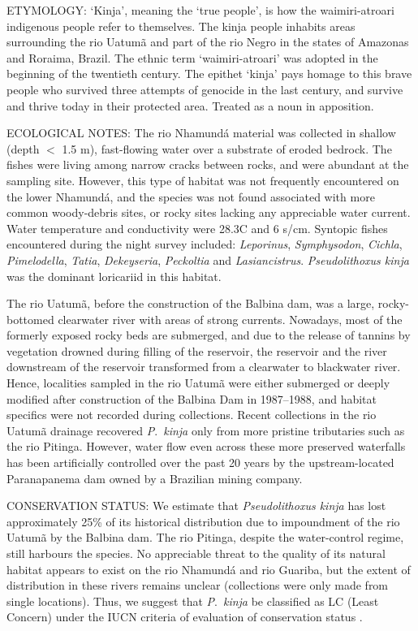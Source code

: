\documentclass[12pt]{article}
\begin{document}
\noindent ETYMOLOGY: `Kinja', meaning the `true people', is how the waimiri-atroari indigenous people refer to themselves. %
The kinja people inhabits areas surrounding the rio Uatumã and part of the rio Negro in the states of Amazonas and Roraima, Brazil. %
The ethnic term `waimiri-atroari' was adopted in the beginning of the twentieth century. %
The epithet `kinja' pays homage to this brave people who survived three attempts of genocide in the last century, and survive and thrive today in their protected area. %
Treated as a noun in apposition. \\%
\bigskip

\noindent ECOLOGICAL NOTES: The rio Nhamundá material was collected in shallow (depth $<$ 1.5 m), fast-flowing water over a substrate of eroded bedrock. %
The fishes were living among narrow cracks between rocks, and were abundant at the sampling site. %
However, this type of habitat was not frequently encountered on the lower Nhamundá, and the species was not found associated with more common woody-debris sites, or rocky sites lacking any appreciable water current. %
Water temperature and conductivity were 28.3\degree C and 6 \micro s/cm. %
Syntopic fishes encountered during the night survey included: \emph{Leporinus}, \emph{Symphysodon}, \emph{Cichla}, \emph{Pimelodella}, \emph{Tatia}, \emph{Dekeyseria}, \emph{Peckoltia} and \emph{Lasiancistrus}. %
\emph{Pseudolithoxus kinja} was the dominant loricariid in this habitat.%

The rio Uatumã, before the construction of the Balbina dam, was a large, rocky-bottomed clearwater river with areas of strong currents. %
Nowadays, most of the formerly exposed rocky beds are submerged, and due to the release of tannins by vegetation drowned during filling of the reservoir, the reservoir and the river downstream of the reservoir transformed from a clearwater to blackwater river. %
Hence, localities sampled in the rio Uatumã were either submerged or deeply modified after construction of the Balbina Dam in 1987--1988, and habitat specifics were not recorded during collections. %
Recent collections in the rio Uatumã drainage recovered \emph{P}.\ \emph{kinja} only from more pristine tributaries such as the rio Pitinga. %
However, water flow even across these more preserved waterfalls has been artificially controlled over the past 20 years by the upstream-located Paranapanema dam owned by a Brazilian mining company.\\%
\bigskip

\noindent CONSERVATION STATUS: We estimate that \emph{Pseudolithoxus kinja} has lost approximately 25\% of its historical distribution due to impoundment of the rio Uatumã by the Balbina dam. %
The rio Pitinga, despite the water-control regime, still harbours the species. %
No appreciable threat to the quality of its natural habitat appears to exist on the rio Nhamundá and rio Guariba, but the extent of distribution in these rivers remains unclear (collections were only made from single locations). %
Thus, we suggest that \emph{P}.\ \emph{kinja} be classified as LC (Least Concern) under the IUCN criteria of evaluation of conservation status \citep{IUCN2012}.%
\end{document}
